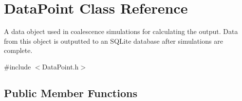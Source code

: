 \hypertarget{class_data_point}{}\section{Data\+Point Class Reference}
\label{class_data_point}


A data object used in coalescence simulations for calculating the output. Data from this object is outputted to an S\+Q\+Lite database after simulations are complete.  




{\ttfamily \#include $<$Data\+Point.\+h$>$}

\subsection*{Public Member Functions}

